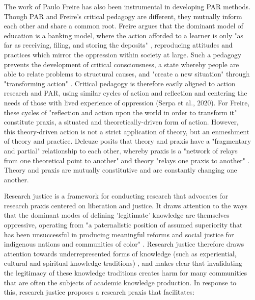 The work of Paulo Freire has also been instrumental in developing PAR methods. Though PAR and Freire's critical pedagogy are different, they mutually inform each other and share a common root. Freire argues that the dominant model of education is a banking model, where the action afforded to a learner is only "as far as receiving, filing, and storing the deposits" \cite{freire_pedagogy_2000, 72}, reproducing attitudes and practices which mirror the oppression within society at large. Such a pedagogy prevents the development of critical consciousness, a state whereby people are able to relate problems to structural causes, and "create a new situation" through "transforming action" \cite{freire_pedagogy_2000, 47}. Critical pedagogy is therefore easily aligned to action research and PAR, using similar cycles of action and reflection and centering the needs of those with lived experience of oppression (Serpa et al., 2020). For Freire, these cycles of "reflection and action upon the world in order to transform it" \cite{freire_pedagogy_2000, 51} constitute praxis, a situated and theoretically-driven form of action. However, this theory-driven action is not a strict application of theory, but an enmeshment of theory and practice. Deleuze posits that theory and praxis have a "fragmentary and partial" relationship to each other, whereby praxis is a "network of relays from one theoretical point to another" and theory "relays one praxis to another" \cite{deleuze_desert_2004, 206}. Theory and praxis are mutually constitutive and are constantly changing one another.

Research justice is a framework for conducting research that advocates for research praxis centered on liberation and justice. It draws attention to the ways that the dominant modes of defining 'legitimate' knowledge are themselves oppressive, operating from "a paternalistic position of assumed superiority that has been unsuccessful in producing meaningful reforms and social justice for indigenous nations and communities of color" \cite{jolivette_research_2015, location 287}. Research justice therefore draws attention towards underrepresented forms of knowledge (such as experiential, cultural and spiritual knowledge traditions) \cite{asad_prefigurative_2019, 4}, and makes clear that invalidating the legitimacy of these knowledge traditions creates harm for many communities that are often the subjects of academic knowledge production. In response to this, research justice proposes a research praxis that facilitates:

